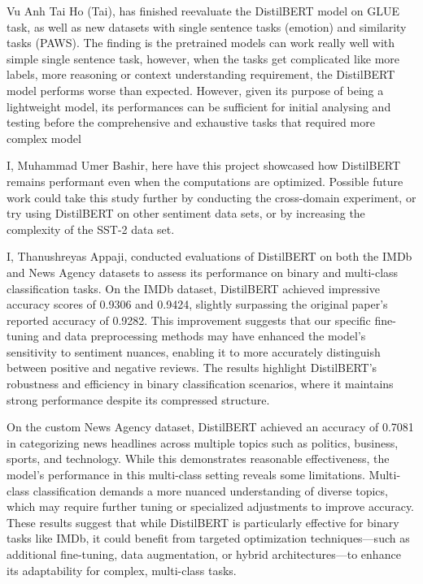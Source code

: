 \documentclass[
  11pt,
]{article}
\begin{document}
Vu Anh Tai Ho (Tai), has finished reevaluate the DistilBERT model on
GLUE task, as well as new datasets with single sentence tasks (emotion)
and similarity tasks (PAWS). The finding is the pretrained models can
work really well with simple single sentence task, however, when the
tasks get complicated like more labels, more reasoning or context
understanding requirement, the DistilBERT model performs worse than
expected. However, given its purpose of being a lightweight model, its
performances can be sufficient for initial analysing and testing before
the comprehensive and exhaustive tasks that required more complex model

I, Muhammad Umer Bashir, here have this project showcased how DistilBERT
remains performant even when the computations are optimized. Possible
future work could take this study further by conducting the cross-domain
experiment, or try using DistilBERT on other sentiment data sets, or by
increasing the complexity of the SST-2 data set.

I, Thanushreyas Appaji, conducted evaluations of DistilBERT on both the IMDb and News Agency datasets to assess its performance on binary and multi-class classification tasks. On the IMDb dataset, DistilBERT achieved impressive accuracy scores of 0.9306 and 0.9424, slightly surpassing the original paper’s reported accuracy of 0.9282. This improvement suggests that our specific fine-tuning and data preprocessing methods may have enhanced the model's sensitivity to sentiment nuances, enabling it to more accurately distinguish between positive and negative reviews. The results highlight DistilBERT’s robustness and efficiency in binary classification scenarios, where it maintains strong performance despite its compressed structure.

On the custom News Agency dataset, DistilBERT achieved an accuracy of 0.7081 in categorizing news headlines across multiple topics such as politics, business, sports, and technology. While this demonstrates reasonable effectiveness, the model's performance in this multi-class setting reveals some limitations. Multi-class classification demands a more nuanced understanding of diverse topics, which may require further tuning or specialized adjustments to improve accuracy. These results suggest that while DistilBERT is particularly effective for binary tasks like IMDb, it could benefit from targeted optimization techniques—such as additional fine-tuning, data augmentation, or hybrid architectures—to enhance its adaptability for complex, multi-class tasks.
\end{document}
